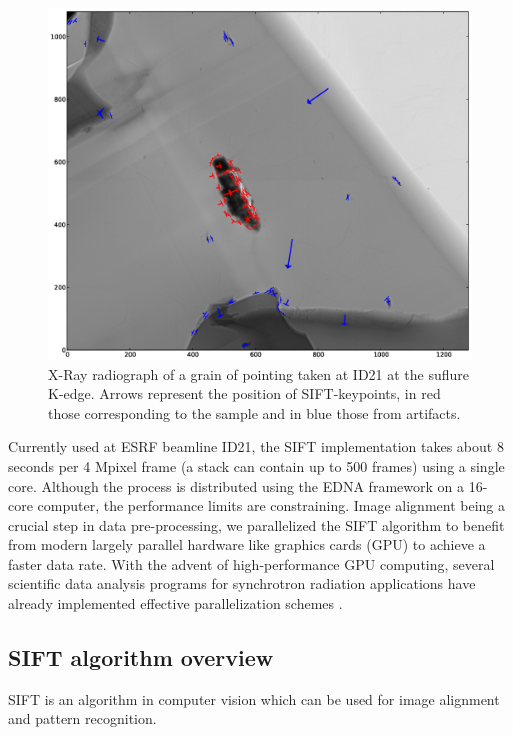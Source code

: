 \documentclass[preprint]{iucr}
\begin{document}
\begin{figure}
\begin{center}
\includegraphics[width=15cm]{features.eps}
\caption{\label{sample} X-Ray radiograph of a grain of pointing taken at ID21 at
the suflure K-edge. Arrows represent the position of SIFT-keypoints, in red
those corresponding to the sample and in blue those from artifacts.}
\end{center}
\end{figure}


Currently used at ESRF beamline ID21, the SIFT implementation takes about 8
seconds per 4 Mpixel frame  (a stack can contain up to  500 frames) using
a single core.
Although the process is distributed using the EDNA framework \cite{edna} on a 
16-core computer, the performance limits are constraining.
Image alignment being a crucial step in data pre-processing, we parallelized the
SIFT algorithm to benefit from modern largely parallel
hardware like graphics cards (GPU) to achieve a faster data rate.
With the advent of high-performance GPU computing, several scientific data
analysis programs for synchrotron radiation applications have already
implemented effective parallelization schemes  
\cite{pynx,pyfai,pyhst2}.

\subsection{SIFT algorithm overview}
SIFT is an algorithm in computer vision which can be used for image alignment
and pattern recognition.  
\end{document}
